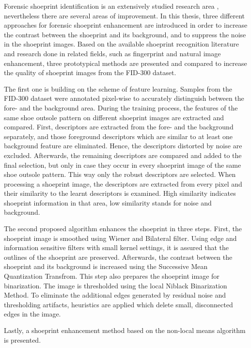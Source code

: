\documentclass[draft,final]{vutinfth} %
\begin{document}
\par
Forensic shoeprint identification is an extensively studied research area \cite{rida2019forensic}, nevertheless there are several areas of improvement.
In this thesis, three different approaches for forensic shoeprint enhancement are introduced in order to increase the contrast between the shoeprint and its background, and to suppress the noise in the shoeprint images.
Based on the available shoeprint recognition literature and research done in related fields, such as fingerprint and natural image enhancement, three prototypical methods are presented and compared to increase the quality of shoeprint images from the FID-300 dataset.
\par
The first one is building on the scheme of feature learning.
Samples from the FID-300 dataset were annotated pixel-wise to accurately distinguish between the fore- and the background area.
During the training process, the features of the same shoe outsole pattern on different shoeprint images are extracted and compared.
First, descriptors are extracted from the fore- and the background separately, and those foreground descriptors which are similar to at least one background feature are eliminated. 
Hence, the descriptors distorted by noise are excluded.
Afterwards, the remaining descriptors are compared and added to the final selection, but only in case they occur in every shoeprint image of the same shoe outsole pattern.
This way only the robust descriptors are selected.
When processing a shoeprint image, the descriptors are extracted from every pixel and their similarity to the learnt descriptors is examined.
High similarity indicates shoeprint information in that area, low similarity stands for noise and background.
\par
The second proposed algorithm enhances the shoeprint in three steps.
First, the shoeprint image is smoothed using Wiener and Bilateral filter.
Using edge and information sensitive filters with small kernel settings, it is assured that the outlines of the shoeprint are preserved.
Afterwards, the contrast between the shoeprint and its background is increased using the Successive Mean Quantization Transfrom.
This step also prepares the shoeprint image for binarization.
The image is thresholded using the local Niblack Binarization Method.
To eliminate the additional edges generated by residual noise and thresholding artifacts, heuristics are applied which delete small, disconnected edges in the image.
\par
Lastly, a shoeprint enhancement method based on the non-local means algorithm is presented.
\end{document}
